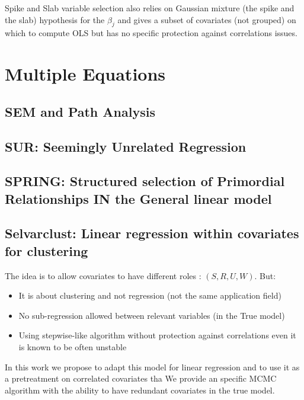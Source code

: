 \documentclass[12pt,a4paper]{report}
\begin{document}
			\cite{ishwaran2005spike}%
			Spike and Slab variable selection \cite{ishwaran2005spike} also relies on Gaussian mixture (the spike and the slab) hypothesis for the $\beta_j$ and gives a subset of covariates (not grouped) on which to compute \textsc{OLS} but has no specific protection against correlations issues.
	\section{Multiple Equations}		%

		\subsection{SEM and Path Analysis}		%

		\subsection{SUR: Seemingly Unrelated Regression}		%

			\cite{SURzellner}
		\subsection{SPRING: Structured selection of Primordial Relationships IN the General linear model}		%

			\cite{chiquetconf}			
			
		\subsection{Selvarclust: Linear regression within covariates for clustering}		%

			\cite{maugis2009variable}
			The idea is to allow covariates to have different roles : $(S,R,U,W)$.
			But:
			\begin{itemize}
				\item It is about clustering and not regression (not the same application field)
				\item No sub-regression allowed between relevant variables (in the True model)
				\item Using stepwise-like algorithm without protection against correlations \cite{raftery2006variable} even it is known to be often unstable \cite{miller2002subset}
			\end{itemize}
			In this work we propose to adapt this model for linear regression and to use it as a pretreatment on correlated covariates tha	
			We provide an specific MCMC algorithm with the ability to have redundant covariates in the true model.		 
\end{document}

